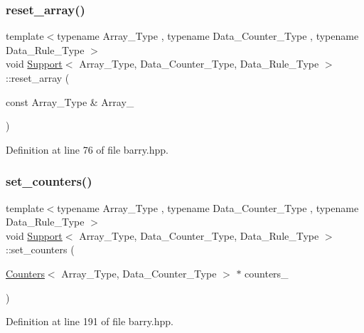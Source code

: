 \subsubsection{\texorpdfstring{reset\+\_\+array()}{reset\_array()}\hspace{0.1cm}{\footnotesize\ttfamily [2/2]}}
{\footnotesize\ttfamily template$<$typename Array\+\_\+\+Type , typename Data\+\_\+\+Counter\+\_\+\+Type , typename Data\+\_\+\+Rule\+\_\+\+Type $>$ \\
void \hyperlink{classbarry_1_1_support}{Support}$<$ Array\+\_\+\+Type, Data\+\_\+\+Counter\+\_\+\+Type, Data\+\_\+\+Rule\+\_\+\+Type $>$\+::reset\+\_\+array (\begin{DoxyParamCaption}\item[{const Array\+\_\+\+Type \&}]{Array\+\_\+ }\end{DoxyParamCaption})\hspace{0.3cm}{\ttfamily [inline]}}



Definition at line 76 of file barry.\+hpp.

\mbox{\label{classbarry_1_1_support_aef83474cda55c4ed52e313e8ed948b08}} 
\subsubsection{\texorpdfstring{set\+\_\+counters()}{set\_counters()}}
{\footnotesize\ttfamily template$<$typename Array\+\_\+\+Type , typename Data\+\_\+\+Counter\+\_\+\+Type , typename Data\+\_\+\+Rule\+\_\+\+Type $>$ \\
void \hyperlink{classbarry_1_1_support}{Support}$<$ Array\+\_\+\+Type, Data\+\_\+\+Counter\+\_\+\+Type, Data\+\_\+\+Rule\+\_\+\+Type $>$\+::set\+\_\+counters (\begin{DoxyParamCaption}\item[{\hyperlink{classbarry_1_1_counters}{Counters}$<$ Array\+\_\+\+Type, Data\+\_\+\+Counter\+\_\+\+Type $>$ $\ast$}]{counters\+\_\+ }\end{DoxyParamCaption})\hspace{0.3cm}{\ttfamily [inline]}}



Definition at line 191 of file barry.\+hpp.

\mbox{\label{classbarry_1_1_support_a66dc1a0e7097d547ea9c84df777ad477}} 
